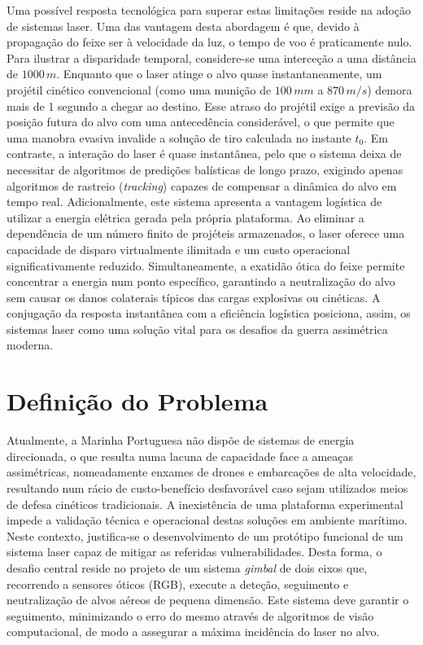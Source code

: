 \begin{introduction}
Uma possível resposta tecnológica para superar estas limitações reside na adoção de sistemas laser. Uma das vantagem desta abordagem é que, devido à propagação do feixe ser à velocidade da luz, o tempo de voo é praticamente nulo. Para ilustrar a disparidade temporal, considere-se uma interceção a uma distância de $1000\,m$. Enquanto que o laser atinge o alvo quase instantaneamente, um projétil cinético convencional (como uma munição de $100\,mm$ a $870\,m/s$) demora mais de 1 segundo a chegar ao destino. Esse atraso do projétil exige a previsão da posição futura do alvo com uma antecedência considerável, o que permite que uma manobra evasiva invalide a solução de tiro calculada no instante $t_0$. Em contraste, a interação do laser é quase instantânea, pelo que o sistema deixa de necessitar de algoritmos de predições balísticas de longo prazo, exigindo apenas algoritmos de rastreio (\emph{tracking}) capazes de compensar a dinâmica do alvo em tempo real. Adicionalmente, este sistema apresenta a vantagem logística de utilizar a energia elétrica gerada pela própria plataforma. Ao eliminar a dependência de um número finito de projéteis armazenados, o laser oferece uma capacidade de disparo virtualmente ilimitada e um custo operacional significativamente reduzido. Simultaneamente, a exatidão ótica do feixe permite concentrar a energia num ponto específico, garantindo a neutralização do alvo sem causar os danos colaterais típicos das cargas explosivas ou cinéticas. A conjugação da resposta instantânea com a eficiência logística posiciona, assim, os sistemas laser como uma solução vital para os desafios da guerra assimétrica moderna.


\section{Definição do Problema}

Atualmente, a Marinha Portuguesa não dispõe de sistemas de energia direcionada, o que resulta numa lacuna de capacidade face a ameaças assimétricas, nomeadamente enxames de drones e embarcações de alta velocidade, resultando num rácio de custo-benefício desfavorável caso sejam utilizados meios de defesa cinéticos tradicionais. A inexistência de uma plataforma experimental impede a validação técnica e operacional destas soluções em ambiente marítimo. Neste contexto, justifica-se o desenvolvimento de um protótipo funcional de um sistema laser capaz de mitigar as referidas vulnerabilidades. Desta forma, o desafio central reside no projeto de um sistema \emph{gimbal} de dois eixos que, recorrendo a sensores óticos (RGB), execute a deteção, seguimento e neutralização de alvos aéreos de pequena dimensão. Este sistema deve garantir o seguimento, minimizando o erro do mesmo através de algoritmos de visão computacional, de modo a assegurar a máxima incidência do laser no alvo.



\end{introduction}
